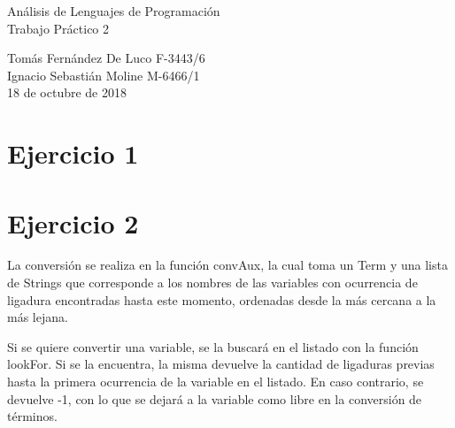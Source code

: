 \documentclass{article}
\begin{document}
\begin{titlepage}
\vspace{5.5cm}

\begin{center}
\LARGE{\sc Análisis de Lenguajes de Programación}\\
\vspace{0.5cm}
\large{Trabajo Práctico 2}\\

\vspace{5cm}

\large
Tomás Fernández De Luco F-3443/6\\
Ignacio Sebastián Moline M-6466/1\\

\vspace*{0.5cm}
\small{18 de octubre de 2018}

\makeatletter
\def\@seccntformat#1{%
  \expandafter\ifx\csname c@#1\endcsname\c@section\else
  \csname the#1\endcsname\quad
  \fi}
\makeatother



\end{center}
\end{titlepage}
\lstset{basicstyle=\small,style=myCustom}
	\newpage
	
	\section*{Ejercicio 1}

	
		
	\section*{Ejercicio 2}
	La conversión se realiza en la función convAux, la cual toma un Term y una lista de Strings que corresponde a los nombres de las variables con ocurrencia de ligadura encontradas hasta este momento, ordenadas desde la más cercana a la más lejana.
	
	 Si se quiere convertir una variable, se la buscará en el listado con la función lookFor. Si se la encuentra, la misma devuelve la cantidad de ligaduras previas hasta la primera ocurrencia de la variable en el listado. En caso contrario, se devuelve -1, con lo que se dejará a la variable como libre en la conversión de términos.
	
\end{document}
